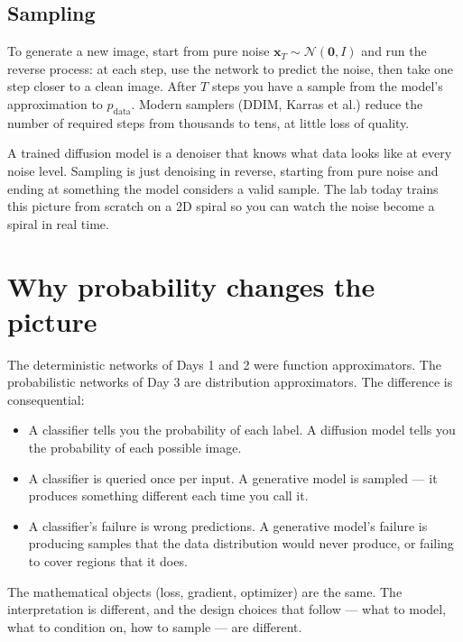 \subsection{Sampling}

To generate a new image, start from pure noise $\bm{x}_T \sim \mathcal{N}(\bm{0}, I)$ and run the reverse process: at each step, use the network to predict the noise, then take one step closer to a clean image. After $T$ steps you have a sample from the model's approximation to $p_{\text{data}}$. Modern samplers (DDIM, Karras et al.) reduce the number of required steps from thousands to tens, at little loss of quality.

\begin{intuition}
A trained diffusion model is a denoiser that knows what data looks like at every noise level. Sampling is just denoising in reverse, starting from pure noise and ending at something the model considers a valid sample. The lab today trains this picture from scratch on a 2D spiral so you can watch the noise become a spiral in real time.
\end{intuition}

\section{Why probability changes the picture}

The deterministic networks of Days 1 and 2 were function approximators. The probabilistic networks of Day 3 are distribution approximators. The difference is consequential:

\begin{itemize}
  \item A classifier tells you the probability of each label. A diffusion model tells you the probability of each possible image.
  \item A classifier is queried once per input. A generative model is sampled --- it produces something different each time you call it.
  \item A classifier's failure is wrong predictions. A generative model's failure is producing samples that the data distribution would never produce, or failing to cover regions that it does.
\end{itemize}

The mathematical objects (loss, gradient, optimizer) are the same. The interpretation is different, and the design choices that follow --- what to model, what to condition on, how to sample --- are different.

